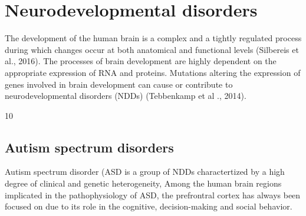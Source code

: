 \documentclass[12pt]{article}
\begin{document}
\section{Neurodevelopmental disorders}
The development of the human brain is a complex and a tightly regulated process during which changes occur at both
anatomical and functional levels (Silbereis et al., 2016). The processes of brain development are highly
dependent on the appropriate expression of RNA and proteins. Mutations altering the expression of genes involved in brain development can cause or contribute to neurodevelopmental disorders (NDDs)
(Tebbenkamp et al ., 2014).


10%
\subsection{Autism spectrum disorders}
Autism spectrum disorder (ASD is a group of NDDs charactertized by a high degree of clinical and genetic heterogeneity,
Among the human brain regions implicated in the pathophysiology of ASD, the prefrontral cortex has always been focused on due to its role in the cognitive, decision-making and social behavior.
\end{document}
